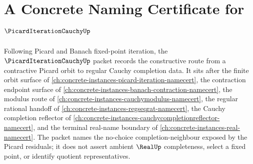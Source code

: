 \chapter{A Concrete Naming Certificate for $\PicardIterationCauchyUp$}
\label{ch:concrete-instances-picard-iteration-cauchy-namecert}

Following Picard and Banach fixed-point iteration, the $\PicardIterationCauchyUp$ packet records the constructive route from a contractive Picard orbit to regular Cauchy completion data. It sits after the finite orbit surface of \autoref{ch:concrete-instances-picard-iteration-namecert}, the contraction endpoint surface of \autoref{ch:concrete-instances-banach-contraction-namecert}, the modulus route of \autoref{ch:concrete-instances-cauchymodulus-namecert}, the regular rational handoff of \autoref{ch:concrete-instances-regseqrat-namecert}, the Cauchy completion reflector of \autoref{ch:concrete-instances-cauchycompletionreflector-namecert}, and the terminal real-name boundary of \autoref{ch:concrete-instances-real-namecert}. The packet names the no-choice completion-neighbour exposed by the Picard residuals; it does not assert ambient $\RealUp$ completeness, select a fixed point, or identify quotient representatives.

